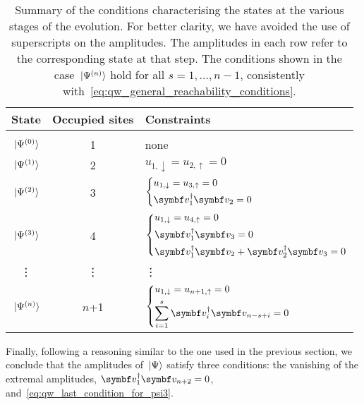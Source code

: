 \begin{table}
\centering
\begin{tabular}{cc@{\quad}l}
	\toprule
	\textbf{State} & \textbf{Occupied sites} & \textbf{Constraints} \\
	\midrule \\
	$\ket*{\Psi^{(0)}}$ & 1 & none \\
	\addlinespace[2pt]
	$\ket*{\Psi^{(1)}}$ & 2 & $u_{1,\downarrow} = u_{2,\uparrow} = 0$ \\
	\addlinespace[5pt]
	$\ket*{\Psi^{(2)}}$ & 3 &
	$\begin{dcases}
		u_{1,\downarrow} = u_{3,\uparrow} = 0 \\
		\bs v_1^{\dagger} \bs v_2 = 0
	\end{dcases}$ \\
	\addlinespace[5pt]
	$\ket*{\Psi^{(3)}}$ & 4 &
	$\begin{dcases}
		u_{1,\downarrow} = u_{4,\uparrow} = 0 \\
		\bs v_1^{\dagger} \bs v_3 = 0 \\
		\bs v_1^{\dagger} \bs v_2 + \bs v_2^{\dagger} \bs v_3 = 0
	\end{dcases}$ \\\addlinespace[4pt]
	\vdots & \vdots & \qquad\quad\vdots \\
	$\ket*{\Psi^{(n)}}$ & $n$+1 &
	$\begin{dcases}
		u_{1,\downarrow} = u_{n + 1,\uparrow} = 0 \\
		\sum_{i=1}^s \bs v_i^{\dagger} \bs v_{n-s+i} = 0
	\end{dcases}$ \\
	\bottomrule
\end{tabular}
\caption{
	Summary of the conditions characterising the states at the various stages of the evolution.
	For better clarity, we have avoided the use of superscripts on the amplitudes.
The amplitudes in each row refer to the corresponding state at that step.
	The conditions shown in the case $\ket*{\Psi^{(n)}}$ hold for all $s=1,..., n-1$, consistently with~\cref{eq:qw_general_reachability_conditions}.
}
\label{table:qw_constraints}
\end{table}
Finally, following a reasoning similar to the one used in the previous section, we conclude that the amplitudes of $\ket*{\Psi}$ satisfy three conditions:
the vanishing of the extremal amplitudes, $\bs v_1^{\dagger} \bs v_{n+2} = 0$, and~\cref{eq:qw_last_condition_for_psi3}.

